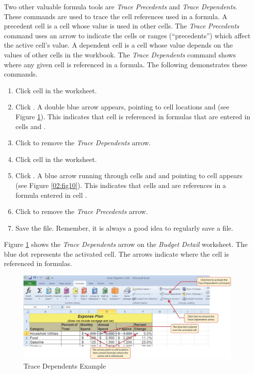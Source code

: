 Two other valuable formula tools are \textit{Trace Precedents} and \textit{Trace Dependents}. These commands are used to trace the cell references used in a formula. A precedent cell is a cell whose value is used in other cells. The \textit{Trace Precedents} command uses an arrow to indicate the cells or ranges (``precedents'') which affect the active cell's value. A dependent cell is a cell whose value depends on the values of other cells in the workbook. The \textit{Trace Dependents} command shows where any given cell is referenced in a formula. The following demonstrates these commands.

\begin{enumerate}
	\item Click cell  in the  worksheet.
	\item Click . A double blue arrow appears, pointing to cell locations  and  (see Figure \ref{02:fig09}). This indicates that cell  is referenced in formulas that are entered in cells  and .
	\item Click  to remove the \textit{Trace Dependents} arrow.
	\item Click cell  in the  worksheet.
	\item Click . A blue arrow running through cells  and  and pointing to cell  appears (see Figure \ref{02:fig10}). This indicates that cells  and  are references in a formula entered in cell .
	\item Click  to remove the \textit{Trace Precedents} arrow.
	\item Save the  file. Remember, it is always a good idea to regularly save a file.
\end{enumerate}

Figure \ref{02:fig09} shows the \textit{Trace Dependents} arrow on the \textit{Budget Detail} worksheet. The blue dot represents the activated cell. The arrows indicate where the cell is referenced in formulas.

\begin{figure}[H]
	\centering
	\includegraphics[width=\maxwidth{.95\linewidth}]{gfx/ch02_fig09}
	\caption{Trace Dependents Example}
	\label{02:fig09}
\end{figure}

